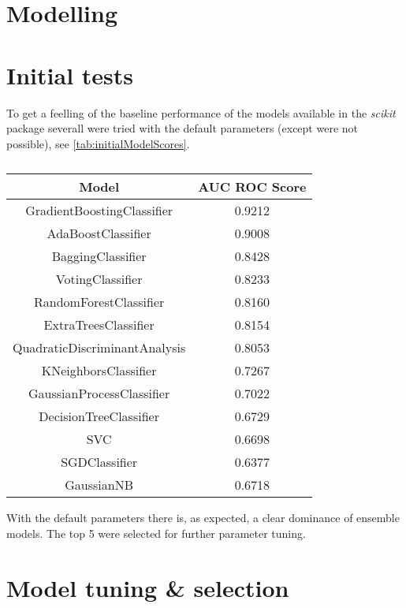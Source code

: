 \section{Modelling}
\label{sec:modelling}

\section{Initial tests}
\label{sec:initialTests}
To get a feelling of the baseline performance of the models available in
the \emph{scikit} package severall were tried with the default parameters
(except were not possible), see \vref{tab:initialModelScores}.

\begin{table}[!h]
    \caption{}
    \label{tab:initialModelScores}
    \centering
    \begin{tabular}{cc}
        Model & AUC ROC Score \\
        \hline
        GradientBoostingClassifier & 0.9212 \\
        AdaBoostClassifier & 0.9008 \\
        BaggingClassifier & 0.8428 \\
        VotingClassifier & 0.8233 \\
        RandomForestClassifier & 0.8160 \\
        ExtraTreesClassifier & 0.8154 \\
        QuadraticDiscriminantAnalysis & 0.8053 \\
        KNeighborsClassifier & 0.7267 \\
        GaussianProcessClassifier & 0.7022 \\
        DecisionTreeClassifier & 0.6729 \\
        SVC & 0.6698 \\
        SGDClassifier & 0.6377 \\
        GaussianNB & 0.6718 \\
    \end{tabular}
\end{table}


With the default parameters there is, as expected, a clear dominance of
ensemble models.
The top 5 were selected for further parameter tuning.

\section{Model tuning \& selection}
\label{sec:modelTuning}

